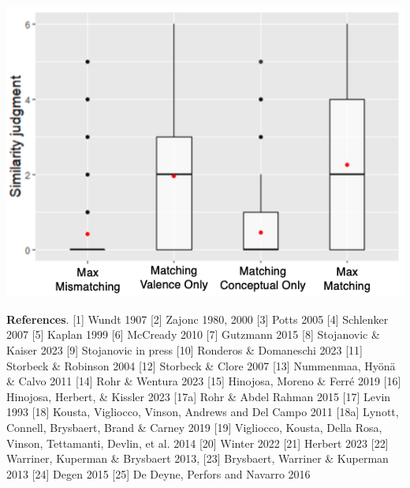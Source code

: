 \begin{tcolorbox}[colback=white]
\begin{minipage}{0.5\linewidth}
    \vspace{-.2cm}
    \includegraphics[scale=0.3]{figures/exp2.png}
    \vspace{-.2cm}
\end{minipage}
\begin{minipage}{0.45\linewidth}
    \label{fig:exp3}
    \vspace{-.5cm}
    
\end{minipage}
\end{tcolorbox}

\small
\noindent \textbf{References}.
[1] Wundt 1907
[2] Zajonc 1980, 2000
[3] Potts 2005 
[4] Schlenker 2007 
[5] Kaplan 1999 
[6] McCready 2010 
[7] Gutzmann 2015 
[8] Stojanovic \& Kaiser 2023 
[9] Stojanovic in press 
[10] Ronderos \& Domaneschi 2023 
[11] Storbeck \& Robinson 2004 
[12] Storbeck \& Clore 2007 
[13] Nummenmaa, Hyönä \& Calvo 2011 
[14] Rohr \& Wentura 2023 
[15] Hinojosa, Moreno \& Ferré 2019 
[16] Hinojosa, Herbert, \& Kissler 2023
[17a] Rohr \& Abdel Rahman 2015 
[17] Levin 1993
[18] Kousta, Vigliocco, Vinson, Andrews and Del Campo 2011 
[18a] Lynott, Connell, Brysbaert, Brand \& Carney 2019 
[19] Vigliocco, Kousta, Della Rosa, Vinson, Tettamanti, Devlin, et al. 2014 
[20] Winter 2022 
[21] Herbert 2023 
[22] Warriner, Kuperman \& Brysbaert 2013,
[23] Brysbaert, Warriner \& Kuperman 2013
[24] Degen 2015 
[25] De Deyne, Perfors and Navarro 2016




